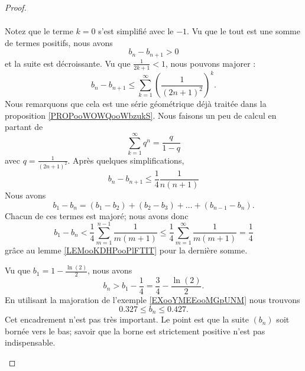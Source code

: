 \begin{proof}
\begin{subproof}
\begin{subequations}
\begin{align}
			\end{align}
		\end{subequations}
		Notez que le terme \( k=0\) s'est simplifié avec le \( -1\). Vu que le tout est une somme de termes positifs, nous avons
		\begin{equation}
			b_n-b_{n+1}>0
		\end{equation}
		et la suite est décroissante.
		Vu que \( \frac{1}{ 2k+1 }<1\), nous pouvons majorer :
		\begin{equation}
			b_n-b_{n+1}\leq \sum_{k=1}^{\infty}\left( \frac{1}{ (2n+1)^2 } \right)^k.
		\end{equation}
		Nous remarquons que cela est une série géométrique déjà traitée dans la proposition \ref{PROPooWOWQooWbzukS}. Nous faisons un peu de calcul en partant de
		\begin{equation}
			\sum_{k=1}^{\infty}q^n=\frac{ q }{ 1-q }
		\end{equation}
		avec \( q=\frac{1}{ (2n+1)^2 }\). Après quelques simplifications,
		\begin{equation}
			b_n-b_{n+1}\leq \frac{1}{ 4 }\frac{ 1 }{ n(n+1) }
		\end{equation}
		Nous avons
		\begin{equation}
			b_1-b_n=(b_1-b_2)+(b_2-b_3)+\ldots+(b_{n-1}-b_n).
		\end{equation}
		Chacun de ces termes est majoré; nous avons donc
		\begin{equation}
			b_1-b_n<\frac{1}{ 4 }\sum_{m=1}^{n-1}\frac{1}{ m(m+1) }\leq \frac{1}{ 4 }\sum_{m=1}^{\infty}\frac{1}{ m(m+1) }=\frac{1}{ 4 }
		\end{equation}
		grâce au lemme \ref{LEMooKDHPooPlFTIT} pour la dernière somme.

		Vu que \( b_1=1-\frac{ \ln(2) }{2}\), nous avons
		\begin{equation}
			b_n>b_1-\frac{1}{ 4 }=\frac{ 3 }{ 4 }-\frac{ \ln(2) }{ 2 }.
		\end{equation}
		En utilisant la majoration de l'exemple \ref{EXooYMEEooMGpUNM} nous trouvons
		\begin{equation}
			0.327\leq b_n\leq 0.427.
		\end{equation}
		Cet encadrement n'est pas très important. Le point est que la suite \( (b_n)\) soit bornée vers le bas; savoir que la borne est strictement positive n'est pas indispensable.


\end{subproof}
\end{proof}
